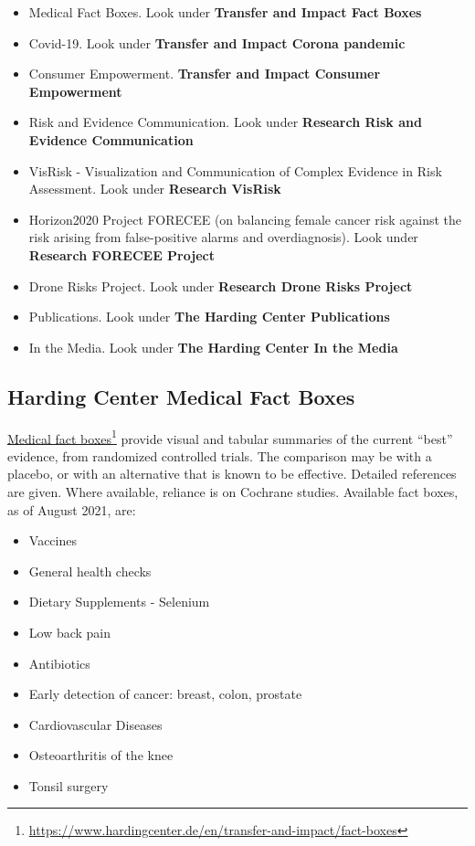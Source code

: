 \documentclass[
  10pt,
  b5paper]{book}
\providecommand{\tightlist}{%
  \setlength{\itemsep}{0pt}\setlength{\parskip}{0pt}}
\begin{document}
\begin{itemize}
\tightlist
\item
  Medical Fact Boxes. Look under \textbf{Transfer and Impact \textbar{} Fact Boxes}
\item
  Covid-19. Look under \textbf{Transfer and Impact \textbar{} Corona pandemic}
\item
  Consumer Empowerment. \textbf{Transfer and Impact \textbar{} Consumer
  Empowerment}
\item
  Risk and Evidence Communication. Look under \textbf{Research \textbar{} Risk and
  Evidence Communication}
\item
  VisRisk - Visualization and Communication of Complex Evidence in
  Risk Assessment. Look under \textbf{Research \textbar{} VisRisk}
\item
  Horizon2020 Project FORECEE (on balancing female cancer risk against
  the risk arising from false-positive alarms and overdiagnosis). Look
  under \textbf{Research \textbar{} FORECEE Project}
\item
  Drone Risks Project. Look under \textbf{Research \textbar{} Drone Risks Project}
\item
  Publications. Look under \textbf{The Harding Center \textbar{} Publications}
\item
  In the Media. Look under \textbf{The Harding Center \textbar{} In the Media}
\end{itemize}

\hypertarget{harding-center-medical-fact-boxes}{%
\subsection*{Harding Center Medical Fact Boxes}\label{harding-center-medical-fact-boxes}}

\href{https://www.hardingcenter.de/en/transfer-and-impact/fact-boxes}{Medical fact
boxes}\footnote{\url{https://www.hardingcenter.de/en/transfer-and-impact/fact-boxes}}
provide visual and tabular summaries of the current ``best'' evidence,
from randomized controlled trials. The comparison may be with a placebo,
or with an alternative that is known to be effective. Detailed
references are given. Where available, reliance is on Cochrane studies.
Available fact boxes, as of August 2021, are:

\begin{itemize}
\tightlist
\item
  Vaccines
\item
  General health checks
\item
  Dietary Supplements - Selenium
\item
  Low back pain
\item
  Antibiotics
\item
  Early detection of cancer: breast, colon, prostate
\item
  Cardiovascular Diseases
\item
  Osteoarthritis of the knee
\item
  Tonsil surgery
\end{itemize}
\end{document}

